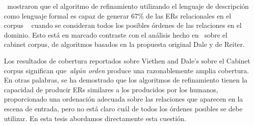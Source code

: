 \cite{arec2:2008:Areces}~mostraron que el algoritmo de refinamiento utilizando el lenguaje de descripci\'on \el como lenguaje formal es capaz de generar 67\% de
las ERs relacionales en el corpus ~\cite{viethen06:_algor_for_gener_refer_expres} cuando se consideran todos los posibles \'ordenes de las relaciones en el dominio. Esto est\'a en marcado contraste con el an\'alisis hecho en~\cite{viethen06:_algor_for_gener_refer_expres} sobre el cabinet corpus, de algoritmos basados en la propuesta original Dale y de Reiter.



Los resultados de cobertura reportados sobre Viethen and 
Dale's sobre el Cabinet corpus significan que~\emph{alg\'un orden} produce una razonablemente amplia cobertura. En otras palabras, se ha demostrado que los algoritmos de refinamiento tienen la capacidad de producir ERs similares a los producidos por los humanos, proporcionado una ordenaci\'on adecuada sobre las relaciones que aparecen
en la escena de entrada, pero no est\'a claro cu\'al de todos los \'ordenes posibles se debe utilizar. En esta tesis abordamos directamente esta cuesti\'on.


